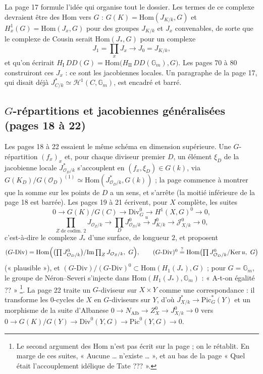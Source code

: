 \documentclass[11pt,a4paper]{article}
\begin{document}
La page 17 formule l'idée qui organise tout le dossier. Les termes de ce complexe
devraient être des $\mathrm{Hom}$ vers $G$ : $G(K) = \mathrm{Hom}(J_{K/k}, G)$ et
$H^1_x(G) = \mathrm{Hom}(J_x, G)$ pour des groupes $J_{K/k}$ et $J_x$ convenables,
de sorte que le complexe de Cousin serait $\mathrm{Hom}(J_*, G)$ pour un complexe
\[
J_1 = \prod_x J_x \longrightarrow J_0 = J_{K/k},
\]
et qu'on écrirait $H_{\mathrm{I}}\,DD(G) = \mathrm{Hom}\bigl(H_{\mathrm{II}}\,
DD(\mathbb{G}_m), G\bigr)$. Les pages 70 à 80 construiront ces $J_x$ : ce sont les
jacobiennes locales. Un paragraphe de la page 17, qui disait déjà
$J^{*}_{C/k} \simeq \mathcal{H}^1(C, \mathbb{G}_m)$, est encadré et barré.

\subsection*{$G$-répartitions et jacobiennes généralisées (pages 18 à 22)}

Les pages 18 à 22 essaient le même schéma en dimension supérieure. Une
$G$-répartition $(f_x)_x$ et, pour chaque diviseur premier $D$, un élément
$\xi_D$ de la jacobienne locale $J^{*}_{\mathcal{O}_D/k}$ s'accouplent en $(f_x,
\xi_D) \in G(k)$, via $G(K_D)/G(\mathcal{O}_D)^{(1)} \simeq \mathrm{Hom}
(J^{*}_{\mathcal{O}_D/k}, G(k))$ ; la page commence à montrer que la somme sur
les points de $D$ a un sens, et s'arrête (la moitié inférieure de la page 18 est
barrée). Les pages 19 à 21 écrivent, pour $X$ complète, les suites
\[
0 \to G(K)/G(C) \to \mathrm{Div}^0_G \to H^1(X, G)^0 \to 0,
\]
\[
\prod_{Z \text{ de codim. } 2} J_{\mathcal{O}_Z/k} \to \prod_D J^0_{\mathcal{O}_D/k}
\xrightarrow{u} J^0_{K/k} \to \mathcal{J}^0_{X/k} \to 0,
\]
c'est-à-dire le complexe $J_*$ d'une surface, de longueur $2$, et proposent
\[
(G\text{-}\mathrm{Div}) = \mathrm{Hom}\Bigl(\bigl(\textstyle\prod J^0_{\mathcal{O}_D/k}\bigr)/
\mathrm{Im} \textstyle\prod_Z J_{\mathcal{O}_Z/k},\ G\Bigr),
\qquad
(G\text{-}\mathrm{Div})^0 \overset{?}{=} \mathrm{Hom}\bigl(\textstyle\prod J^0_{\mathcal{O}_D/k}/
\mathrm{Ker}\,u,\ G\bigr)
\]
(« plausible »), et $(G\text{-}\mathrm{Div})/(G\text{-}\mathrm{Div})^0 \subset
\mathrm{Hom}(H_1(J_*), G)$ ; pour $G = \mathbb{G}_m$, le groupe de Néron–Severi
s'injecte dans $\mathrm{Hom}(H_1(J_*), \mathbb{G}_m)$ : « A-t-on égalité ?? »
\footnote{Le second argument des $\mathrm{Hom}$ n'est pas écrit sur la page ; on
le rétablit. En marge de ces suites, « Aucune … n'existe … », et au bas de la
page « Quel était l'accouplement idélique de Tate ??? ».}. La page 22 traite un
$G$-diviseur sur $X \times Y$ comme une correspondance : il transforme les
$0$-cycles de $X$ en $G$-diviseurs sur $Y$, d'où $J^{*}_{X/k} \to
\mathrm{Pic}^{*}_G(Y)$ et un morphisme de la suite d'Albanese $0 \to
N_{\mathrm{Alb}} \to Z^0_X \to J^0_{X/k} \to 0$ vers $0 \to G(K)/G(Y) \to
\mathrm{Div}^0(Y, G) \to \mathrm{Pic}^0(Y, G) \to 0$.
\end{document}
